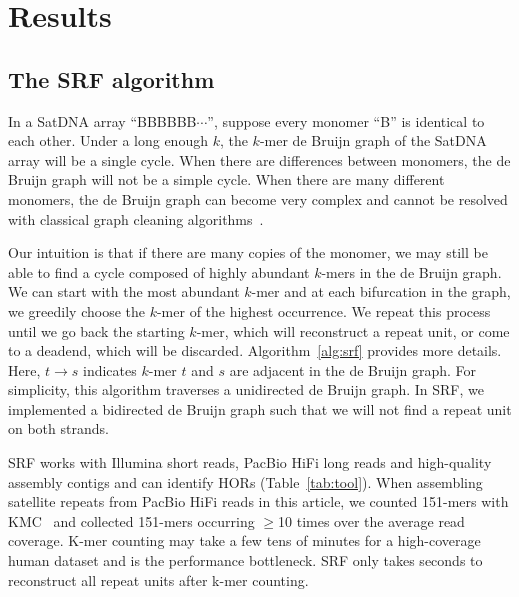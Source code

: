 \documentclass{bioinfo}
\begin{document}
\section{Results}

\subsection{The SRF algorithm}

In a SatDNA array ``{\sf BBBBBB$\cdots$}'', suppose every monomer ``{\sf B}''
is identical to each other. Under a long enough $k$, the $k$-mer de Bruijn
graph of the SatDNA array will be a single cycle.  When there are
differences between monomers, the de Bruijn graph will not be a simple cycle.
When there are many different monomers, the de Bruijn graph can become very
complex and cannot be resolved with classical graph cleaning
algorithms~\citep{Zerbino:2008uq}.

Our intuition is that if there are many copies of the monomer, we may still be
able to find a cycle composed of highly abundant $k$-mers in the de Bruijn
graph. We can start with the most abundant $k$-mer and at each bifurcation in
the graph, we greedily choose the $k$-mer of the highest occurrence. We repeat
this process until we go back the starting $k$-mer, which will reconstruct a
repeat unit, or come to a deadend, which will be discarded.
Algorithm~\ref{alg:srf} provides more details. Here, $t\to s$ indicates $k$-mer
$t$ and $s$ are adjacent in the de Bruijn graph. For simplicity, this algorithm
traverses a unidirected de Bruijn graph. In SRF, we implemented a bidirected
de Bruijn graph such that we will not find a repeat unit on both strands.

SRF works with Illumina short reads, PacBio HiFi long reads and high-quality
assembly contigs and can identify HORs (Table~\ref{tab:tool}).  When assembling
satellite repeats from PacBio HiFi reads in this article, we counted 151-mers
with KMC~\citep{Kokot:2017aa} and collected 151-mers occurring $\ge$10 times
over the average read coverage. K-mer counting may take a few tens of minutes
for a high-coverage human dataset and is the performance bottleneck. SRF only
takes seconds to reconstruct all repeat units after k-mer counting.
\end{document}
